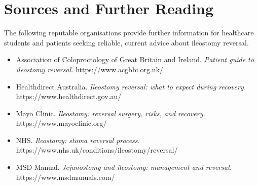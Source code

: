 \section*{Sources and Further Reading}
The following reputable organisations provide further information for healthcare students and patients seeking reliable, current advice about ileostomy reversal.

\begin{itemize}
    \item Association of Coloproctology of Great Britain and Ireland. \textit{Patient guide to ileostomy reversal.} https://www.acgbbi.org.uk/
    \item Healthdirect Australia. \textit{Ileostomy reversal: what to expect during recovery.} https://www.healthdirect.gov.au/
    \item Mayo Clinic. \textit{Ileostomy: reversal surgery, risks, and recovery.} https://www.mayoclinic.org/
    \item NHS. \textit{Ileostomy: stoma reversal process.} https://www.nhs.uk/conditions/ileostomy/reversal/
    \item MSD Manual. \textit{Jejunostomy and ileostomy: management and reversal.} https://www.msdmanuals.com/
\end{itemize}
